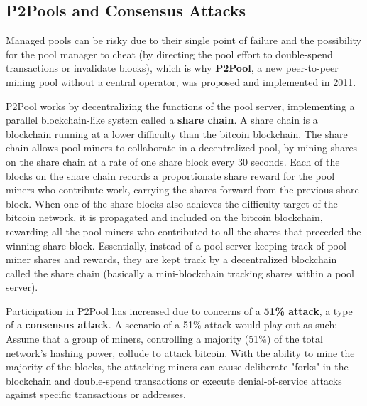 \documentclass{article}
\begin{document}
    \subsection{P2Pools and Consensus Attacks}

    Managed pools can be risky due to their single point of failure and the possibility for the pool manager to cheat (by directing the pool effort to double-spend transactions or invalidate blocks), which is why \textbf{P2Pool}, a new peer-to-peer mining pool without a central operator, was proposed and implemented in 2011.

    P2Pool works by decentralizing the functions of the pool server, implementing a parallel blockchain-like system called a \textbf{share chain}. A share chain is a blockchain running at a lower difficulty than the bitcoin blockchain. The share chain allows pool miners to collaborate in a decentralized pool, by mining shares on the share chain at a rate of one share block every 30 seconds. Each of the blocks on the share chain records a proportionate share reward for the pool miners who contribute work, carrying the shares forward from the previous share block. When one of the share blocks also achieves the difficulty target of the bitcoin network, it is propagated and included on the bitcoin blockchain, rewarding all the pool miners who contributed to all the shares that preceded the winning share block. Essentially, instead of a pool server keeping track of pool miner shares and rewards, they are kept track by a decentralized blockchain called the share chain (basically a mini-blockchain tracking shares within a pool server).

    Participation in P2Pool has increased due to concerns of a \textbf{51\% attack}, a type of a \textbf{consensus attack}. A scenario of a 51\% attack would play out as such: Assume that a group of miners, controlling a majority (51\%) of the total network's hashing power, collude to attack bitcoin. With the ability to mine the majority of the blocks, the attacking miners can cause deliberate "forks" in the blockchain and double-spend transactions or execute denial-of-service attacks against specific transactions or addresses.
\end{document}
